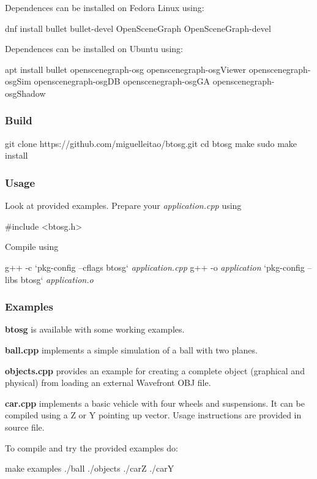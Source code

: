 Dependences can be installed on Fedora Linux using\+: \begin{DoxyVerb}dnf install bullet bullet-devel OpenSceneGraph OpenSceneGraph-devel
\end{DoxyVerb}


Dependences can be installed on Ubuntu using\+: \begin{DoxyVerb}apt install bullet openscenegraph-osg openscenegraph-osgViewer openscenegraph-osgSim openscenegraph-osgDB openscenegraph-osgGA openscenegraph-osgShadow
\end{DoxyVerb}


\subsubsection*{Build}

\begin{DoxyVerb}git clone https://github.com/miguelleitao/btosg.git
cd btosg
make
sudo make install
\end{DoxyVerb}


\subsubsection*{Usage}

Look at provided examples. Prepare your {\itshape application.\+cpp} using \begin{DoxyVerb}#include <btosg.h>
\end{DoxyVerb}


Compile using 
\begin{DoxyPre}
g++ -c `pkg-config --cflags btosg` {\itshape application.cpp}
g++ -o {\itshape application} `pkg-config --libs btosg` {\itshape application.o}
\end{DoxyPre}
 \subsubsection*{Examples}

{\bfseries btosg} is available with some working examples.
\begin{DoxyItemize}
\item {\bfseries ball.\+cpp} implements a simple simulation of a ball with two planes.
\item {\bfseries objects.\+cpp} provides an example for creating a complete object (graphical and physical) from loading an external Wavefront O\+BJ file.
\item {\bfseries car.\+cpp} implements a basic vehicle with four wheels and suspensions. It can be compiled using a Z or Y pointing up vector. Usage instructions are provided in source file.
\end{DoxyItemize}

To compile and try the provided examples do\+: \begin{DoxyVerb}make examples 
./ball
./objects
./carZ
./carY\end{DoxyVerb}
 